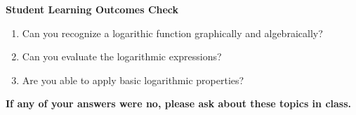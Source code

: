 \noindent \textbf{Student Learning Outcomes Check}

\begin{enumerate}
\item Can you recognize a logarithic function graphically and algebraically?
\item Can you evaluate the logarithmic expressions?
\item Are you able to apply basic logarithmic properties?

\end{enumerate}

\noindent \textbf{If any of your answers were no, please ask about these topics in class.}


